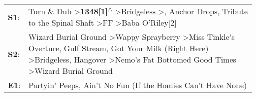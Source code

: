 \begin{supertabular}{p{0.03\textwidth}p{0.92\textwidth}}
 \textbf{S1}:  &                                                                                         Turn \& Dub\textsuperscript{} \textgreater \enspace \textbf{1348[1]\textsuperscript{$\wedge$}} \textgreater \enspace Bridgeless\textsuperscript{} \textgreater {}\textsuperscript{}, \enspace Anchor Drops\textsuperscript{}, \enspace Tribute to the Spinal Shaft\textsuperscript{} \textgreater \enspace FF\textsuperscript{} \textgreater \enspace Baba O'Riley[2]\textsuperscript{}  \enspace  \\
 \textbf{S2}:  &  Wizard Burial Ground\textsuperscript{} \textgreater \enspace Wappy Sprayberry\textsuperscript{} \textgreater \enspace Miss Tinkle's Overture\textsuperscript{}, \enspace Gulf Stream\textsuperscript{}, \enspace Got Your Milk (Right Here)\textsuperscript{} \textgreater \enspace Bridgeless\textsuperscript{}, \enspace Hangover\textsuperscript{} \textgreater \enspace Nemo's Fat Bottomed Good Times\textsuperscript{} \textgreater \enspace Wizard Burial Ground\textsuperscript{}  \enspace  \\
 \textbf{E1}:  &                                                                                                                                                                                                                                                                                                                                                                                  Partyin' Peeps\textsuperscript{}, \enspace Ain't No Fun (If the Homies Can't Have None)\textsuperscript{}  \enspace  \\
\end{supertabular}
